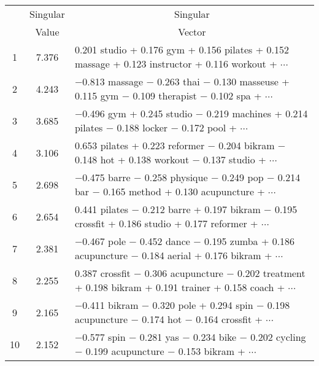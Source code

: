 \documentclass[10pt]{article}
\begin{document}
\pagecolor{tuftebg}

\begin{table}[h]
\begin{center}
\begin{tabular}{c|c|l}
\hline
  & \multicolumn{1}{c|}{Singular} & \multicolumn{1}{c}{Singular} \\
  & \multicolumn{1}{c|}{Value}    & \multicolumn{1}{c}{Vector}   \\
\hline
 1 & 7.376 &  0.201 studio + 0.176 gym + 0.156 pilates + 0.152 massage + 0.123 instructor + 0.116 workout + $\cdots$\\
 2 & 4.243 & $-$0.813 massage $-$ 0.263 thai $-$ 0.130 masseuse + 0.115 gym $-$ 0.109 therapist $-$ 0.102 spa + $\cdots$\\
 3 & 3.685 & $-$0.496 gym + 0.245 studio $-$ 0.219 machines + 0.214 pilates $-$ 0.188 locker $-$ 0.172 pool + $\cdots$\\
 4 & 3.106 &  0.653 pilates + 0.223 reformer $-$ 0.204 bikram $-$ 0.148 hot + 0.138 workout $-$ 0.137 studio + $\cdots$\\
 5 & 2.698 & $-$0.475 barre $-$ 0.258 physique $-$ 0.249 pop $-$ 0.214 bar $-$ 0.165 method + 0.130 acupuncture + $\cdots$\\
 6 & 2.654 &  0.441 pilates $-$ 0.212 barre + 0.197 bikram $-$ 0.195 crossfit + 0.186 studio + 0.177 reformer + $\cdots$\\
 7 & 2.381 & $-$0.467 pole $-$ 0.452 dance $-$ 0.195 zumba + 0.186 acupuncture $-$ 0.184 aerial + 0.176 bikram + $\cdots$\\
 8 & 2.255 &  0.387 crossfit $-$ 0.306 acupuncture $-$ 0.202 treatment + 0.198 bikram + 0.191 trainer + 0.158 coach + $\cdots$\\
 9 & 2.165 & $-$0.411 bikram $-$ 0.320 pole + 0.294 spin $-$ 0.198 acupuncture $-$ 0.174 hot $-$ 0.164 crossfit + $\cdots$\\
 10 & 2.152 & $-$0.577 spin $-$ 0.281 yas $-$ 0.234 bike $-$ 0.202 cycling $-$ 0.199 acupuncture $-$ 0.153 bikram + $\cdots$\\
\hline
\end{tabular}
\end{center}
\end{table}

\end{document}
